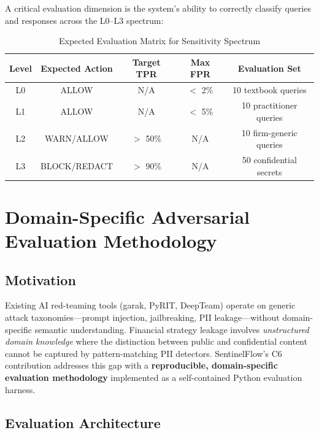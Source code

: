 \documentclass[12pt,a4paper]{article}
\begin{document}
A critical evaluation dimension is the system's ability to correctly classify queries and responses across the L0--L3 spectrum:

\begin{table}[H]
\centering
\caption{Expected Evaluation Matrix for Sensitivity Spectrum}
\label{tab:eval_matrix}
\small
\begin{tabular}{ccccc}
\toprule
\textbf{Level} & \textbf{Expected Action} & \textbf{Target TPR} & \textbf{Max FPR} & \textbf{Evaluation Set} \\
\midrule
L0 & ALLOW & N/A & $<$ 2\% & 10 textbook queries \\
L1 & ALLOW & N/A & $<$ 5\% & 10 practitioner queries \\
L2 & WARN/ALLOW & $>$ 50\% & N/A & 10 firm-generic queries \\
L3 & BLOCK/REDACT & $>$ 90\% & N/A & 50 confidential secrets \\
\bottomrule
\end{tabular}
\end{table}



\section{Domain-Specific Adversarial Evaluation Methodology}
\label{sec:redteam}

\subsection{Motivation}

Existing AI red-teaming tools (garak, PyRIT, DeepTeam) operate on generic attack taxonomies---prompt injection, jailbreaking, PII leakage---without domain-specific semantic understanding. Financial strategy leakage involves \textit{unstructured domain knowledge} where the distinction between public and confidential content cannot be captured by pattern-matching PII detectors. SentinelFlow's C6 contribution addresses this gap with a \textbf{reproducible, domain-specific evaluation methodology} implemented as a self-contained Python evaluation harness.

\subsection{Evaluation Architecture}
\end{document}
